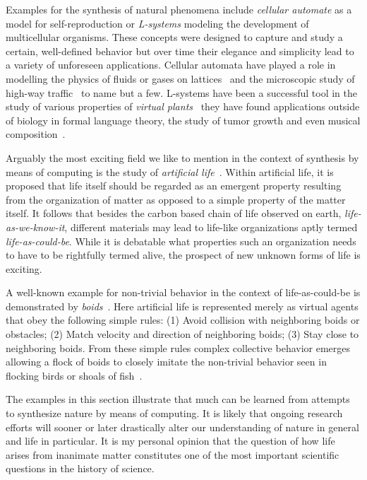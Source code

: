 		Examples for the synthesis of natural phenomena include \emph{cellular automate} as a model for self-reproduction or \emph{L-systems} modeling the development of multicellular organisms. These concepts were designed to capture and study a certain, well-defined behavior but over time their elegance and simplicity lead to a variety of unforeseen applications. Cellular automata have played a role in modelling the physics of fluids or gases on lattices~\cite{rothman2004lattice} and the microscopic study of high-way traffic~\cite{nagel1998two} to name but a few. L-systems have been a successful tool in the study of various properties of \emph{virtual plants}~\cite{tardieu2003virtual} they have found applications outside of biology in formal language theory, the study of tumor growth and even musical composition~\cite{de2005natural}.

		Arguably the most exciting field we like to mention in the context of synthesis by means of computing is the study of \emph{artificial life}~\cite{Langton:1995:ALO:526815}. Within artificial life, it is proposed that life itself should be regarded as an emergent property resulting from the organization of matter as opposed to a simple property of the matter itself. It follows that besides the carbon based chain of life observed on earth, \ie \emph{life-as-we-know-it}, different materials may lead to life-like organizations aptly termed \emph{life-as-could-be}. While it is debatable what properties such an organization needs to have to be rightfully termed alive, the prospect of new unknown forms of life is exciting. 

		A well-known example for non-trivial behavior in the context of life-as-could-be is demonstrated by \emph{boids}~\cite{Reynolds:1987:FHS:37401.37406}. Here artificial life is represented merely as virtual agents that obey the following simple rules: (1) Avoid collision with neighboring boids or obstacles; (2) Match velocity and direction of neighboring boids; (3) Stay close to neighboring boids. From these simple rules complex collective behavior emerges allowing a flock of boids to closely imitate the non-trivial behavior seen in flocking birds or shoals of fish~\cite{de2007fundamentals}.

		The examples in this section illustrate that much can be learned from attempts to synthesize nature by means of computing. It is likely that ongoing research efforts will sooner or later drastically alter our understanding of nature in general and life in particular. It is my personal opinion that the question of how life arises from inanimate matter constitutes one of the most important scientific questions in the history of science.

